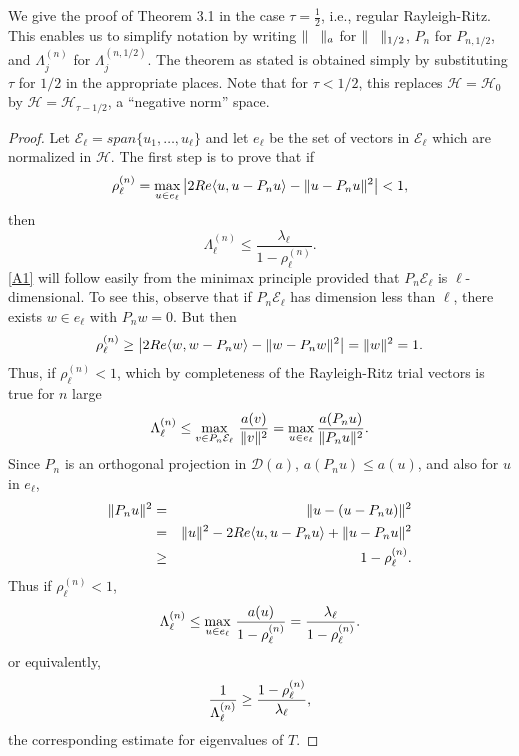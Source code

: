 \documentclass[final]{siamltex}
\numberwithin{equation}{section}
\begin{document}
We give the proof of Theorem 3.1 in the case $\tau=\frac{1}{2}$,
i.e., regular Rayleigh-Ritz. This enables us to simplify notation
by writing $\| \hskip 0.3 cm \|_{a}$ for $\| \hskip 0.3 cm \|_{1/2}$, $P_n$ for $P_{n,1/2}$, and $\Lambda_j^{(n)}$ for
$\Lambda_j^{(n,1/2)}$. The theorem as stated is obtained simply by substituting $\tau$ for $1/2$ in the appropriate
places. Note that for $\tau <1/2$, this replaces $\mathcal{H}=\mathcal{H}_0$ by $\mathcal{H}=\mathcal{H}_{\tau-1/2}$, a
``negative norm'' space.
\begin{proof}
Let $\mathcal{E}_{\ell} = span \{u_1, \ldots, u_{\ell} \}$ and let $e_{\ell}$ be the set of vectors in $\mathcal{E}_{\ell}$ which are normalized in $\mathcal{H}$. The first step is to prove that if
\begin{equation}
\rho_{\ell}^{(n)} = \max_{u \in e_{\ell}} \big| 2 Re \langle u, u - P_n u \rangle- \| u - P_n u\|^2\big|<1, \notag
\end{equation}
then
\begin{equation}
\Lambda_{\ell}^{(n)} \le \dfrac{\lambda_{\ell}}{1-\rho_{\ell}^{(n)}}. \label{A1}
\end{equation}
\eqref{A1} will follow easily from the minimax principle provided that $P_n \mathcal{E}_{\ell}$ is $\ell$-dimensional.
To see this, observe that if $P_n \mathcal{E}_{\ell}$ has dimension less than $\ell$, there exists $w\in e_{\ell}$ with
$P_n w=0$. But then
\begin{equation} \notag
\rho_{\ell}^{(n)} \ge \big| 2 Re \langle w, w - P_n w \rangle- \| w - P_n w\|^2\big|=\|w\|^2=1.
\end{equation}
Thus, if $\rho_{\ell}^{(n)}<1$, which by completeness of the Rayleigh-Ritz trial vectors is true for $n$ large
\begin{equation} \notag
\Lambda_{\ell}^{(n)} \le \max_{v \in P_n \mathcal{E}_{\ell}} \, \dfrac{a(v)}{\|v\|^2}
=\max_{u \in e_{\ell}} \dfrac{a(P_n u)}{\|P_n u\|^2}.
\end{equation}
Since $P_n$ is an orthogonal projection in $\mathcal{D}(a)$, $a(P_n u) \le a(u)$, and also for $u$ in $e_{\ell}$,
\begin{eqnarray}
\|P_n u \|^2 & = & \|u - (u - P_n u)\|^2 \notag \\
& = & \|u\|^2 -2 Re \langle u, u - P_n u\rangle + \|u - P_n u\|^2 \notag \\
& \ge & 1- \rho_{\ell}^{(n)}. \notag
\end{eqnarray}
Thus if $\rho_{\ell}^{(n)} <1$,
\begin{equation} \notag
\Lambda_{\ell}^{(n)} \le \max_{u \in e_{\ell}} \, \dfrac{a(u)}{1-\rho_{\ell}^{(n)}}
=\dfrac{\lambda_{\ell}}{1-\rho_{\ell}^{(n)}}.
\end{equation}
or equivalently,
\begin{equation} \notag
\dfrac{1}{\Lambda_{\ell}^{(n)}} \ge
\dfrac{1-\rho_{\ell}^{(n)}}{\lambda_{\ell}},
\end{equation}
the corresponding estimate for eigenvalues of $T$.


\end{proof}
\end{document}
